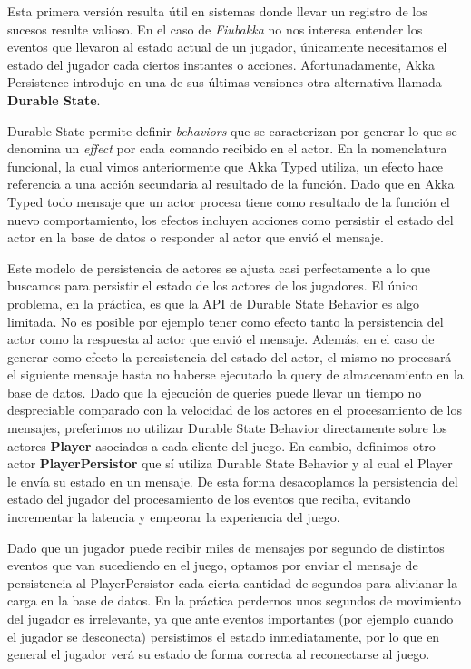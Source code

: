 Esta primera versión resulta útil en sistemas donde llevar un registro de los sucesos resulte valioso. En el caso de \textit{Fiubakka} no nos interesa entender los eventos
que llevaron al estado actual de un jugador, únicamente necesitamos el estado del jugador cada ciertos instantes o acciones.
Afortunadamente, Akka Persistence introdujo en una de sus últimas versiones otra alternativa llamada \textbf{Durable State}.

Durable State permite definir \textit{behaviors} que se caracterizan por generar lo que se denomina un \textit{effect} por cada comando recibido en el actor.
En la nomenclatura funcional, la cual vimos anteriormente que Akka Typed utiliza, un efecto hace referencia a una acción secundaria al resultado de la función.
Dado que en Akka Typed todo mensaje que un actor procesa tiene como resultado de la función el nuevo comportamiento, los efectos incluyen acciones como persistir el estado del actor
en la base de datos o responder al actor que envió el mensaje.

Este modelo de persistencia de actores se ajusta casi perfectamente a lo que buscamos para persistir el estado de los actores de los jugadores.
El único problema, en la práctica, es que la API de Durable State Behavior es algo limitada. No es posible por ejemplo tener como efecto tanto la persistencia del actor
como la respuesta al actor que envió el mensaje. Además, en el caso de generar como efecto la peresistencia del estado del actor, el mismo no procesará el siguiente mensaje hasta no haberse
ejecutado la query de almacenamiento en la base de datos. Dado que la ejecución de queries puede llevar un tiempo no despreciable comparado con la velocidad de los actores en el procesamiento de los mensajes,
preferimos no utilizar Durable State Behavior directamente sobre los actores \textbf{Player} asociados a cada cliente del juego.
En cambio, definimos otro actor \textbf{PlayerPersistor} que sí utiliza Durable State Behavior y al cual el Player le envía su estado en un mensaje.
De esta forma desacoplamos la persistencia del estado del jugador del procesamiento de los eventos que reciba, evitando incrementar la latencia y empeorar la experiencia del juego.

Dado que un jugador puede recibir miles de mensajes por segundo de distintos eventos que van sucediendo en el juego, optamos por enviar el mensaje de persistencia al
PlayerPersistor cada cierta cantidad de segundos para alivianar la carga en la base de datos. En la práctica perdernos unos segundos de movimiento del jugador es irrelevante, ya que ante eventos
importantes (por ejemplo cuando el jugador se desconecta) persistimos el estado inmediatamente, por lo que en general el jugador verá su estado de forma correcta
al reconectarse al juego.

